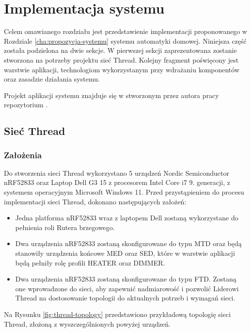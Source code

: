 \chapter{Implementacja systemu}
\label{cha:implementacja}

Celem omawianego rozdziału jest przedstawienie implementacji proponowanego w Rozdziale \ref{cha:propozycja-systemu} systemu automatyki domowej. Niniejsza część została podzielona na dwie sekcje. W pierwszej sekcji zaprezentowana zostanie stworzona na potrzeby projektu sieć Thread. Kolejny fragment poświęcony jest warstwie aplikacji, technologiom wykorzystanym przy wdrażaniu komponentów oraz zasadzie działania systemu.

Projekt aplikacji systemu znajduje się w stworzonym przez autora pracy repozytorium \cite{project-repo}.

\section{Sieć Thread}

    \subsection{Założenia}
    \label{sec:thread-network-assumptions}
    
        Do stworzenia sieci Thread wykorzystano 5 urządzeń Nordic Semiconductor nRF52833 oraz Laptop Dell G3 15 z procesorem Intel Core i7 9. generacji, z systemem operacyjnym Microsoft Windows 11. Przed przystąpieniem do procesu implementacji sieci Thread, dokonano następujących założeń:
        \begin{itemize}
            \item Jedna platforma nRF52833 wraz z laptopem Dell zostaną wykorzystane do pełnienia roli Rutera brzegowego.
            \item Dwa urządzenia nRF52833 zostaną skonfigurowane do typu MTD oraz będą stanowiły urządzenia końcowe MED oraz SED, które w warstwie aplikacji będą pełniły rolę profili HEATER oraz DIMMER.
            \item Dwa urządzenia nRF52833 zostaną skonfigurowane do typu FTD. Zostaną one wprowadzone do sieci, aby zapewnić nadmiarowość i pozwolić Liderowi Thread na dostosowanie topologii do aktualnych potrzeb i wymagań sieci.
        \end{itemize}

        Na Rysunku \ref{fig:thread-topology} przedstawiono przykładową topologię sieci Thread, złożoną z wyszczególnionych powyżej urządzeń.

